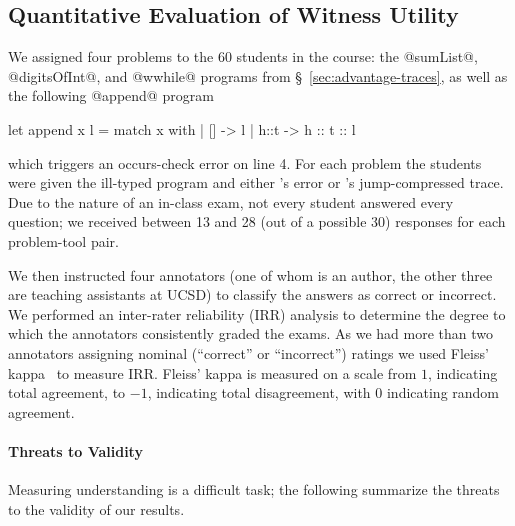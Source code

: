 \subsection{Quantitative Evaluation of Witness Utility}
\label{sec:user-study}
%
We assigned four problems to the 60 students in the course: the
@sumList@, \hbox{@digitsOfInt@,} and @wwhile@ programs from
\S~\ref{sec:advantage-traces}, as well as the following @append@ program
%
\begin{ecode}
  let append x l =
    match x with
    | []   -> l
    | h::t -> h :: t :: l
\end{ecode}
%
which triggers an occurs-check error on line 4.
%
For each problem the students were given the ill-typed program and
either \ocaml's error or \toolname's jump-compressed trace.
%
Due to the nature of an in-class exam, not every student answered every
question; we received between 13 and 28 (out of a possible 30) responses
for each problem-tool pair.

We then instructed four annotators (one of whom is an author, the other
three are teaching assistants at UCSD) to classify the answers as
correct or incorrect.
%
We performed an inter-rater reliability (IRR) analysis to determine the
degree to which the annotators consistently graded the exams.
%
As we had more than two annotators assigning nominal (``correct'' or
``incorrect'') ratings we used Fleiss' kappa~\cite{Fleiss1971-du} to
measure IRR.\@
%
Fleiss' kappa is measured on a scale from $1$, indicating total
agreement, to $-1$, indicating total disagreement, with $0$ indicating
random agreement.

\paragraph{Threats to Validity}
Measuring understanding is a difficult task; the following summarize
the threats to the validity of our results.

